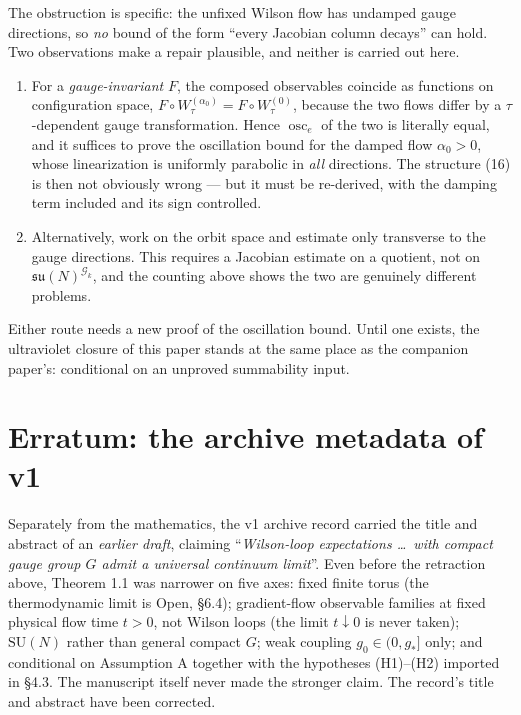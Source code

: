 \documentclass[11pt]{article}
\newcommand{\su}{\mathfrak{su}}
\begin{document}
The obstruction is specific: the unfixed Wilson flow has undamped gauge directions, so
\emph{no} bound of the form ``every Jacobian column decays'' can hold. Two observations
make a repair plausible, and neither is carried out here.

\begin{enumerate}
\item[(a)] For a \emph{gauge-invariant} $F$, the composed observables coincide as
functions on configuration space, $F\circ W^{(\alpha_0)}_\tau=F\circ W^{(0)}_\tau$,
because the two flows differ by a $\tau$-dependent gauge transformation. Hence
$\operatorname{osc}_e$ of the two is literally equal, and it suffices to prove the
oscillation bound for the damped flow $\alpha_0>0$, whose linearization is uniformly
parabolic in \emph{all} directions. The structure (16) is then not obviously wrong ---
but it must be re-derived, with the damping term included and its sign controlled.
\item[(b)] Alternatively, work on the orbit space and estimate only transverse to the
gauge directions. This requires a Jacobian estimate on a quotient, not on
$\su(N)^{\mathcal G_k}$, and the counting above shows the two are genuinely different
problems.
\end{enumerate}

\noindent
Either route needs a new proof of the oscillation bound. Until one exists, the
ultraviolet closure of this paper stands at the same place as the companion paper's:
conditional on an unproved summability input.

\section{Erratum: the archive metadata of v1}

Separately from the mathematics, the v1 archive record carried the title and abstract
of an \emph{earlier draft}, claiming ``\emph{Wilson-loop expectations \ldots\ with
compact gauge group $G$ admit a universal continuum limit}''. Even before the
retraction above, Theorem 1.1 was narrower on five axes: fixed finite torus (the
thermodynamic limit is Open, \S6.4); gradient-flow observable families at fixed
physical flow time $t>0$, not Wilson loops (the limit $t\downarrow 0$ is never taken);
$\mathrm{SU}(N)$ rather than general compact $G$; weak coupling $g_0\in(0,g_*]$ only;
and conditional on Assumption A together with the hypotheses (H1)--(H2) imported in
\S4.3. The manuscript itself never made the stronger claim. The record's title and
abstract have been corrected.
\end{document}
